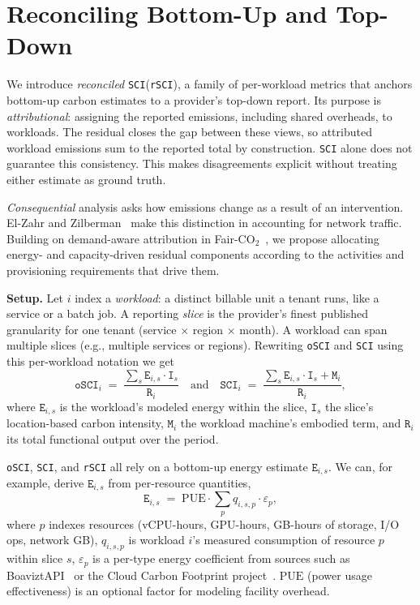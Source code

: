 \documentclass[sigconf]{acmart}
\newcommand{\parag}[1]{\vspace{2mm}\noindent\textbf{#1.}\hspace{2mm}}
\newcommand{\SCI}{\texttt{SCI}\xspace}
\newcommand{\RSCI}{\texttt{rSCI}\xspace}
\newcommand{\OSCI}{\texttt{oSCI}\xspace}
\newcommand{\E}{\texttt{E}\xspace}
\newcommand{\I}{\texttt{I}\xspace}
\newcommand{\M}{\texttt{M}\xspace}
\newcommand{\R}{\texttt{R}\xspace}
\begin{document}
\section{Reconciling Bottom-Up and Top-Down}
\label{sec:rsci}

We introduce \emph{reconciled} \SCI (\RSCI), a family of per-workload metrics that anchors bottom-up carbon estimates to a provider's top-down report.
Its purpose is \emph{attributional}: assigning the reported emissions, including shared overheads, to workloads.
The residual closes the gap between these views, so attributed workload emissions sum to the reported total by construction.
\SCI alone does not guarantee this consistency.
This makes disagreements explicit without treating either estimate as ground truth.

\emph{Consequential} analysis asks how emissions change as a result of an intervention.
El-Zahr and Zilberman~\cite{elzahr2025measurement} make this distinction in accounting for network traffic.
Building on demand-aware attribution in Fair-CO$_2$~\cite{han2025fairco2}, we propose allocating energy- and capacity-driven residual components according to the activities and provisioning requirements that drive them.

\parag{Setup}
Let $i$ index a \emph{workload}: a distinct billable unit a tenant runs, like a service or a batch job.
A reporting \emph{slice} is the provider's finest published granularity for one tenant (service $\times$ region $\times$ month).
A workload can span multiple slices (e.g., multiple services or regions).
Rewriting \OSCI and \SCI using this per-workload notation we get
\begin{equation}
\OSCI_i \;=\; \frac{\sum_s \E_{i,s}\cdot\I_s}{\R_i}
\quad\text{and}\quad
\SCI_i \;=\; \frac{\sum_s \E_{i,s}\cdot\I_s + \M_i}{\R_i},
\label{eq:osci-sci-repetition}
\end{equation}
where $\E_{i,s}$ is the workload's modeled energy within the slice, $\I_s$ the slice's location-based carbon intensity, $\M_i$ the workload machine's embodied term, and $\R_i$ its total functional output over the period.

\OSCI, \SCI, and \RSCI all rely on a bottom-up energy estimate $\E_{i,s}$.
We can, for example, derive $\E_{i,s}$ from per-resource quantities,
\begin{equation}
\E_{i,s} \;=\; \mathrm{PUE}\cdot\sum_{p} q_{i,s,p} \cdot \varepsilon_p,
\label{eq:bu-energy}
\end{equation}
where $p$ indexes resources (vCPU-hours, GPU-hours, GB-hours of storage, I/O ops, network GB),
$q_{i,s,p}$ is workload $i$'s measured consumption of resource $p$ within slice $s$,
$\varepsilon_p$ is a per-type energy coefficient from sources such as BoaviztAPI~\cite{simon2024boaviztapi} or the Cloud Carbon Footprint project~\cite{cloudcarbonfootprint}.
$\mathrm{PUE}$ (power usage effectiveness) is an optional factor for modeling facility overhead.
\end{document}
